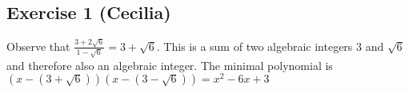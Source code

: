 \subsection*{Exercise 1 (Cecilia)}
Observe that $ \frac{3 + 2\sqrt{6}}{1 - \sqrt{6}} = 3 + \sqrt{6} $. This is a sum of two algebraic integers $ 3 $ and $ \sqrt{6} $ and therefore also an algebraic integer. The minimal polynomial is $ (x - (3 + \sqrt{6}))(x - (3 - \sqrt{6})) = x^2 - 6x + 3 $